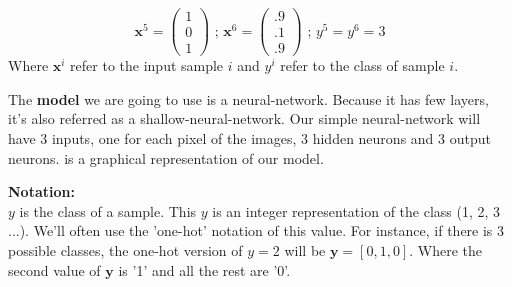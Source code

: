 		$$ \boldsymbol{x}^5 = \left( \begin{matrix} 1  \\ 0  \\ 1  \end{matrix}\right) \text{ ; }
		   \boldsymbol{x}^6 = \left( \begin{matrix} .9 \\ .1 \\ .9 \end{matrix}\right) \text{ ; }
		   y^5 = y^6 = 3 $$
		Where $\boldsymbol{x}^i$ refer to the input sample $i$ and $y^i$ refer to the class of sample $i$.

		The \textbf{model} we are going to use is a neural-network. Because it has few layers, it's also referred as a shallow-neural-network. Our simple neural-network will have 3 inputs, one for each pixel of the images, 3 hidden neurons and 3 output neurons.  is a graphical representation of our model.

		\vskip 1cm
		\textbf{Notation: }\\
		$y$ is the class of a sample. This $y$ is an integer representation of the class (1, 2, 3 ...). We'll often use the 'one-hot' notation of this value. For instance, if there is 3 possible classes, the one-hot version of $y=2$ will be $\boldsymbol{y} = [0,1,0]$. Where the second value of $\boldsymbol{y}$ is '1' and all the rest are '0'.

